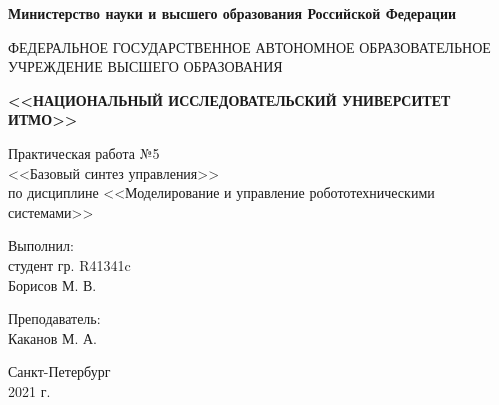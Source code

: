 \begin{titlepage}
    \begin{center}
        \begin{small}
            \textbf{Министерство науки и высшего образования Российской Федерации}

            \vspace{1em}

            ФЕДЕРАЛЬНОЕ ГОСУДАРСТВЕННОЕ АВТОНОМНОЕ ОБРАЗОВАТЕЛЬНОЕ\\
            УЧРЕЖДЕНИЕ ВЫСШЕГО ОБРАЗОВАНИЯ

            \vspace{1em}

            \textbf{<<НАЦИОНАЛЬНЫЙ ИССЛЕДОВАТЕЛЬСКИЙ УНИВЕРСИТЕТ ИТМО>>}
        \end{small}

        \vspace{13ex}

        Практическая работа №5\\
        <<Базовый синтез управления>>\\
        по дисциплине <<Моделирование и управление робототехническими системами>>
    \end{center}

    \vspace{14em}

    \begin{flushright}
        \noindent
        Выполнил:\\
        студент гр. R41341c\\
        Борисов М. В.

        \vspace{1em}
        Преподаватель:\\
        Каканов М. А.
    \end{flushright}

    \vfill

    \begin{center}
        \large{Санкт-Петербург}\\
        2021 г.\\
    \end{center}
\end{titlepage}
